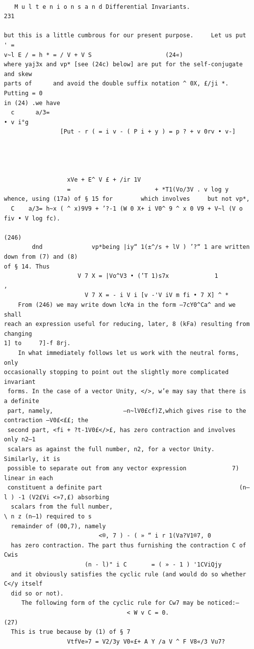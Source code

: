 \documentclass[10pt]{article}
\begin{document}
\clearpage
\begin{verbatim}

   M u l t e n i o n s a n d Differential Invariants.                             231

but this is a little cumbrous for our present purpose.     Let us put
' =                                                                                                       v~l E / = h * = / V + V S                     (24«)
where yaj3x and vp* [see (24c) below] are put for the self-conjugate and skew
parts of      and avoid the double suffix notation ^ 0X, £/ji *. Putting = 0
in (24) .we have
  c      a/3=                                                           • v i°g
                [Put - r ( = i v - ( P i + y ) = p ? + v 0rv • v-]




                  xVe + E^ V £ + /ir 1V
                  =                        + *T1(Vo/3V . v log y
whence, using (17a) of § 15 for        which involves     but not vp*,
  C    a/3= h~x ( ^ x)9V9 + ’?-1 (W 0 X+ i V0^ 9 ^ x 0 V9 + V~l (V o fiv • V log fc).
                                                                                  (246)
        dnd              vp*being |iy“ 1(±^/s + lV ) ’?“ 1 are written down from (7) and (8)
of § 14. Thus
                     V 7 X = |Vo^V3 • (’T 1)s7x             1                           ,
                       V 7 X = - i V i [v -'V iV m fi • 7 X] ^ *
    From (246) we may write down lc¥a in the form —7cY0^Ca^ and we shall
reach an expression useful for reducing, later, 8 (kFa) resulting from changing
1] to     7]-f 8rj.
    In what immediately follows let us work with the neutral forms, only
occasionally stopping to point out the slightly more complicated invariant
 forms. In the case of a vector Unity, </>, w’e may say that there is a definite
 part, namely,                    —n~lV0£cf)Z,which gives rise to the contraction —V0£<££; the
 second part, <fi + ?t-1V0£</>£, has zero contraction and involves only n2—1
 scalars as against the full number, n2, for a vector Unity. Similarly, it is
 possible to separate out from any vector expression             7) linear in each
 constituent a definite part                                       (n—l ) -1 (V2£Vi <»7,£) absorbing
  scalars from the full number,                                         \ n z (n—1) required to s
  remainder of (00,7), namely
                           <®, 7 ) - ( » “ i r 1(Va?V1®7, 0
  has zero contraction. The part thus furnishing the contraction C of Cwis
                       (n - l)" i C       = ( » - 1 ) '1CViQjy
  and it obviously satisfies the cyclic rule (and would do so whether C</y itself
  did so or not).
     The following form of the cyclic rule for Cw7 may be noticed:—
                                   < W v C = 0.                             (27)
  This is true because by (1) of § 7
                  VtfVe»7 = V2/3y V0«£+ A Y /a V ^ F V8«/3 Vu7?


\end{verbatim}
\end{document}
